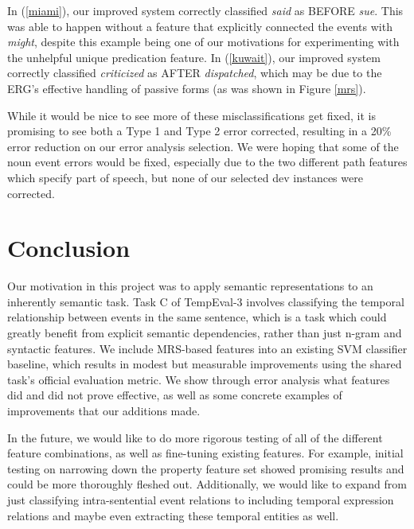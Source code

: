 \documentclass[11pt]{article}
\begin{document}
In (\ref{miami}), our improved system correctly classified \emph{said} as BEFORE \emph{sue}. This was able to happen without a feature that explicitly connected the events with \emph{might}, despite this example being one of our motivations for experimenting with the unhelpful unique predication feature. In (\ref{kuwait}), our improved system correctly classified \emph{criticized} as AFTER \emph{dispatched}, which may be due to the ERG's effective handling of passive forms (as was shown in Figure \ref{mrs}).

While it would be nice to see more of these misclassifications get fixed, it is promising to see both a Type 1 and Type 2 error corrected, resulting in a 20\% error reduction on our error analysis selection. We were hoping that some of the noun event errors would be fixed, especially due to the two different path features which specify part of speech, but none of our selected dev instances were corrected.

\section{Conclusion}
\label{conclusion}

Our motivation in this project was to apply semantic representations to an inherently semantic task. Task C of TempEval-3 involves classifying the temporal relationship between events in the same sentence, which is a task which could greatly benefit from explicit semantic dependencies, rather than just n-gram and syntactic features. We include MRS-based features into an existing SVM classifier baseline, which results in modest but measurable improvements using the shared task's official evaluation metric. We show through error analysis what features did and did not prove effective, as well as some concrete examples of improvements that our additions made.

In the future, we would like to do more rigorous testing of all of the different feature combinations, as well as fine-tuning existing features. For example, initial testing on narrowing down the property feature set showed promising results and could be more thoroughly fleshed out. Additionally, we would like to expand from just classifying intra-sentential event relations to including temporal expression relations and maybe even extracting these temporal entities as well.

%
\end{document}
